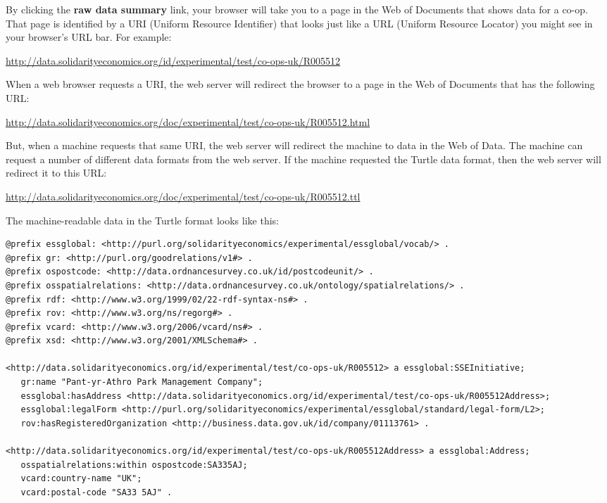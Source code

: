 \geek By clicking the \textbf{raw data summary} link, your browser will take you to a page in the Web of Documents that shows data for a co-op. 
That page is identified by a URI (Uniform Resource Identifier) that looks just like a URL (Uniform Resource Locator) you might see in your browser's URL bar. For example:

{\footnotesize \url{http://data.solidarityeconomics.org/id/experimental/test/co-ops-uk/R005512}}

\geek When a web browser requests a URI, the web server will redirect the browser to a page in the Web of Documents that has the following URL:

{\footnotesize \url{http://data.solidarityeconomics.org/doc/experimental/test/co-ops-uk/R005512.html}}

\geek But, when a machine requests that same URI, the web server will redirect the machine to data in the Web of Data. 
The machine can request a number of different data formats from the web server.
If the machine requested the Turtle data format, then the web server will redirect it to this URL:

{\footnotesize \url{http://data.solidarityeconomics.org/doc/experimental/test/co-ops-uk/R005512.ttl}}

\geek The machine-readable data in the Turtle format looks like this:

\begin{adjustwidth}{-2cm}{0pt}
{\footnotesize
\begin{verbatim}
@prefix essglobal: <http://purl.org/solidarityeconomics/experimental/essglobal/vocab/> .
@prefix gr: <http://purl.org/goodrelations/v1#> .
@prefix ospostcode: <http://data.ordnancesurvey.co.uk/id/postcodeunit/> .
@prefix osspatialrelations: <http://data.ordnancesurvey.co.uk/ontology/spatialrelations/> .
@prefix rdf: <http://www.w3.org/1999/02/22-rdf-syntax-ns#> .
@prefix rov: <http://www.w3.org/ns/regorg#> .
@prefix vcard: <http://www.w3.org/2006/vcard/ns#> .
@prefix xsd: <http://www.w3.org/2001/XMLSchema#> .

<http://data.solidarityeconomics.org/id/experimental/test/co-ops-uk/R005512> a essglobal:SSEInitiative;
   gr:name "Pant-yr-Athro Park Management Company";
   essglobal:hasAddress <http://data.solidarityeconomics.org/id/experimental/test/co-ops-uk/R005512Address>;
   essglobal:legalForm <http://purl.org/solidarityeconomics/experimental/essglobal/standard/legal-form/L2>;
   rov:hasRegisteredOrganization <http://business.data.gov.uk/id/company/01113761> .

<http://data.solidarityeconomics.org/id/experimental/test/co-ops-uk/R005512Address> a essglobal:Address;
   osspatialrelations:within ospostcode:SA335AJ;
   vcard:country-name "UK";
   vcard:postal-code "SA33 5AJ" .
\end{verbatim}
}
\end{adjustwidth}

